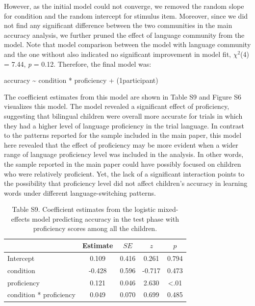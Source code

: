 \documentclass[
  man,floatsintext]{apa7}
\begin{document}
However, as the initial model could not converge, we removed the random slope for condition and the random intercept for stimulus item. Moreover, since we did not find any significant difference between the two communities in the main accuracy analysis, we further pruned the effect of language community from the model. Note that model comparison between the model with language community and the one without also indicated no significant improvement in model fit, \(\chi^2\)(4) = 7.44, \emph{p} = 0.12. Therefore, the final model was:

accuracy \textasciitilde{} condition * proficiency + (1\textbar participant)

The coefficient estimates from this model are shown in Table S9 and Figure S6 visualizes this model. The model revealed a significant effect of proficiency, suggesting that bilingual children were overall more accurate for trials in which they had a higher level of language proficiency in the trial language. In contrast to the patterns reported for the sample included in the main paper, this model here revealed that the effect of proficiency may be more evident when a wider range of language proficiency level was included in the analysis. In other words, the sample reported in the main paper could have possibly focused on children who were relatively proficient. Yet, the lack of a significant interaction points to the possibility that proficiency level did not affect children's accuracy in learning words under different language-switching patterns.

\begin{table}[H]

\begin{center}
\begin{threeparttable}

\caption{\label{tab:unnamed-chunk-27}Table S9. Coefficient estimates from the logistic mixed-effects model predicting accuracy in the test phase with proficiency scores among all the children.}

\begin{tabular}{lcccc}
\toprule
 & Estimate & $SE$ & $z$ & $p$\\
\midrule
Intercept & 0.109 & 0.416 & 0.261 & 0.794\\
condition & -0.428 & 0.596 & -0.717 & 0.473\\
proficiency & 0.121 & 0.046 & 2.630 & <.01\\
condition * proficiency & 0.049 & 0.070 & 0.699 & 0.485\\
\bottomrule
\end{tabular}

\end{threeparttable}
\end{center}

\end{table}
\end{document}
